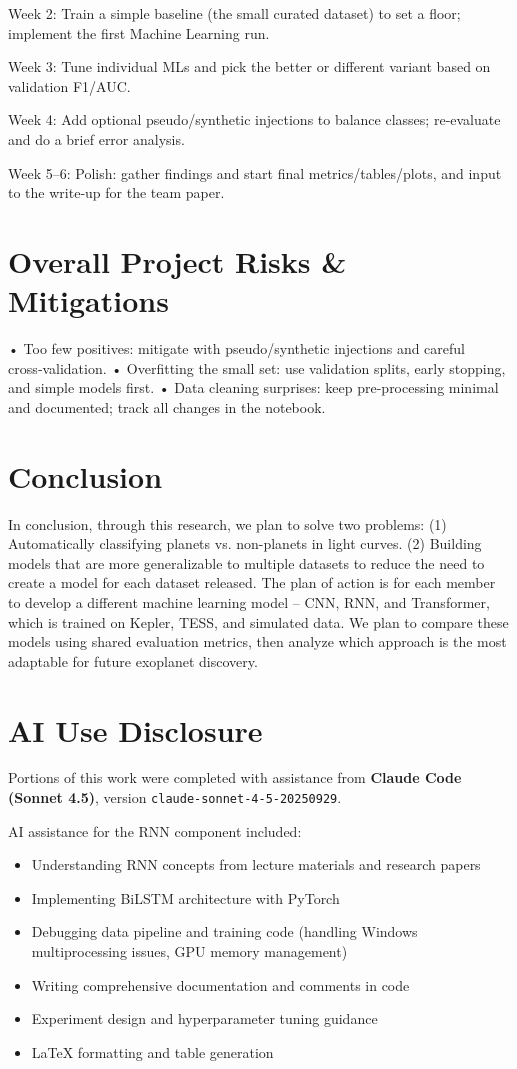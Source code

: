 \documentclass[letterpaper]{article} %
\begin{document}
Week 2: Train a simple baseline (the small curated dataset) to set a floor; implement the first Machine Learning run.

Week 3: Tune individual MLs and pick the better or different variant based on validation F1/AUC.

Week 4: Add optional pseudo/synthetic injections to balance classes; re‑evaluate and do a brief error analysis.

Week 5–6: Polish: gather findings and start final metrics/tables/plots, and input to the write‑up for the team paper.

\section*{Overall Project Risks \& Mitigations}
• Too few positives: mitigate with pseudo/synthetic injections and careful cross‑validation.
• Overfitting the small set: use validation splits, early stopping, and simple models first.
• Data cleaning surprises: keep pre-processing minimal and documented; track all changes in the notebook.

\section*{Conclusion}
In conclusion, through this research, we plan to solve two problems: (1) Automatically classifying planets vs. non-planets in light curves. (2) Building models that are more generalizable to multiple datasets to reduce the need to create a model for each dataset released. The plan of action is for each member to develop a different machine learning model – CNN, RNN, and Transformer, which is trained on Kepler, TESS, and simulated data. We plan to compare these models using shared evaluation metrics, then analyze which approach is the most adaptable for future exoplanet discovery.

\section*{AI Use Disclosure}

Portions of this work were completed with assistance from \textbf{Claude Code (Sonnet 4.5)}, version \texttt{claude-sonnet-4-5-20250929}.

AI assistance for the RNN component included:
\begin{itemize}
\item Understanding RNN concepts from lecture materials and research papers
\item Implementing BiLSTM architecture with PyTorch
\item Debugging data pipeline and training code (handling Windows multiprocessing issues, GPU memory management)
\item Writing comprehensive documentation and comments in code
\item Experiment design and hyperparameter tuning guidance
\item LaTeX formatting and table generation
\end{itemize}
\end{document}
